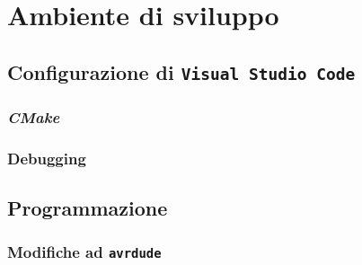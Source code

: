 \chapter{Ambiente di sviluppo}
    \section{Configurazione di \texttt{Visual Studio Code}}
        \subsection{\textit{CMake}}
        \subsection{Debugging}
    \section{Programmazione}
        \subsection{Modifiche ad \texttt{avrdude}}
        